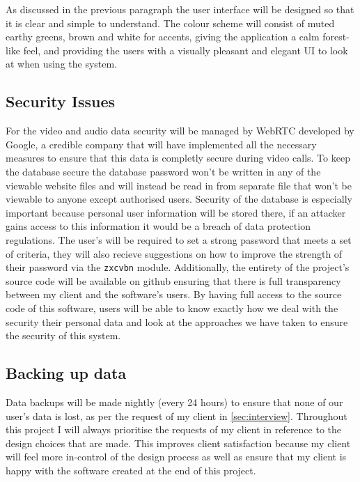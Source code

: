 As discussed in the previous paragraph the user interface will
be designed so that it is clear and simple to understand. The 
colour scheme will consist of muted earthy greens, brown and
white for accents, giving the application a calm forest-like 
feel, and providing the users with a visually pleasant and 
elegant UI to look at when using the system.

\subsection{Security Issues}

For the video and audio data security will be managed by 
WebRTC developed by Google, a credible company that will have
implemented all the necessary measures to ensure that this
data is completly secure during video calls. To keep the 
database secure the database password won't be written in any
of the viewable website files and will instead be read in from
separate file that won't be viewable to anyone except 
authorised users. Security of the database is especially 
important because personal user information will be stored 
there, if an attacker gains access to this information it 
would be a breach of data protection regulations. 
The user's will be required to set a strong password that 
meets a set of criteria, they will also recieve suggestions
on how to improve the strength of their password via the 
\texttt{zxcvbn} module. Additionally, the entirety of the
project's source code will be available on github 
ensuring that there is full transparency between my client 
and the software's users. By having full access to the source
code of this software, users will be able to know exactly how
we deal with the security their personal data and look at the 
approaches we have taken to ensure the security of this
system. 

\subsection{Backing up data}

Data backups will be made nightly (every 24 hours) to ensure
that none of our user's data is lost, as per the request of
my client in \ref{sec:interview}. Throughout this project I 
will always prioritise the requests of my client in reference
to the design choices that are made. This improves client 
satisfaction because my client will feel more in-control of
the design process as well as ensure that my client is happy
with the software created at the end of this project.

